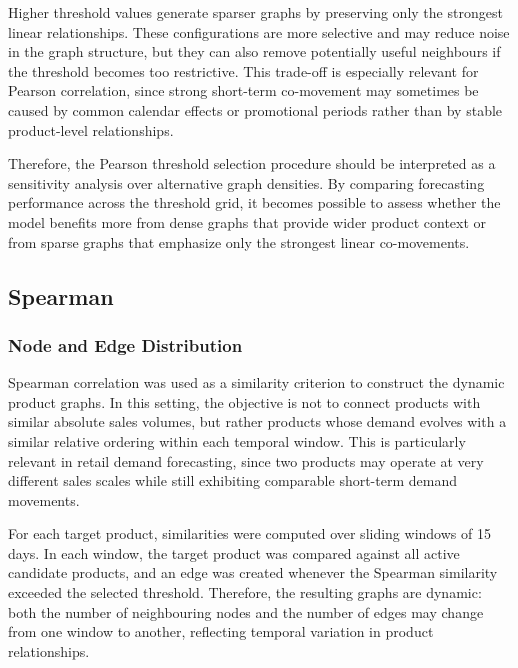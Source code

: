 Higher threshold values generate sparser graphs by preserving only the strongest linear relationships. These configurations are more selective and may reduce noise in the graph structure, but they can also remove potentially useful neighbours if the threshold becomes too restrictive. This trade-off is especially relevant for Pearson correlation, since strong short-term co-movement may sometimes be caused by common calendar effects or promotional periods rather than by stable product-level relationships.

Therefore, the Pearson threshold selection procedure should be interpreted as a sensitivity analysis over alternative graph densities. By comparing forecasting performance across the threshold grid, it becomes possible to assess whether the model benefits more from dense graphs that provide wider product context or from sparse graphs that emphasize only the strongest linear co-movements.
\subsection{Spearman}
\label{subsec:spearman_graphs}

\subsubsection{Node and Edge Distribution}
\label{subsubsec:spearman_node_edge_distribution}

Spearman correlation was used as a similarity criterion to construct the dynamic product graphs. In this setting, the objective is not to connect products with similar absolute sales volumes, but rather products whose demand evolves with a similar relative ordering within each temporal window. This is particularly relevant in retail demand forecasting, since two products may operate at very different sales scales while still exhibiting comparable short-term demand movements.

For each target product, similarities were computed over sliding windows of 15 days. In each window, the target product was compared against all active candidate products, and an edge was created whenever the Spearman similarity exceeded the selected threshold. Therefore, the resulting graphs are dynamic: both the number of neighbouring nodes and the number of edges may change from one window to another, reflecting temporal variation in product relationships.

